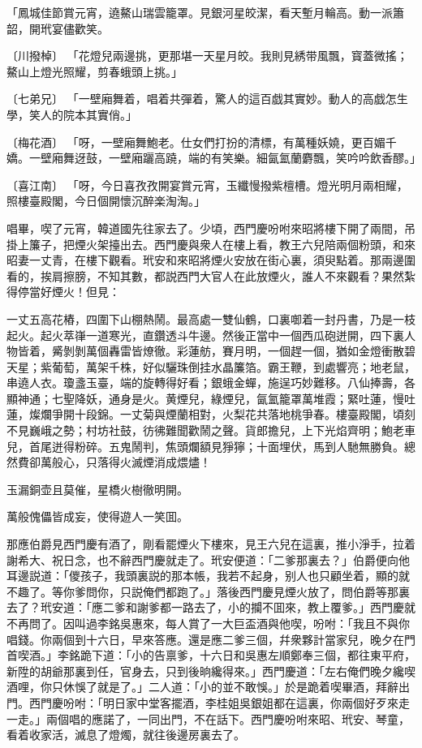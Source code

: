 \begin{myquote}
「鳳城佳節賞元宵，遶鰲山瑞雲籠罩。見銀河星皎潔，看天塹月輪高。動一派簫韶，開玳宴儘歡笑。

{\markfont〔川撥棹〕}
「花燈兒兩邊挑，更那堪一天星月皎。我則見綉带風飄，寳蓋微搖；鰲山上燈光照耀，剪春蛾頭上挑。」

{\markfont〔七弟兄〕}
「一壁廂舞着，唱着共彈着，驚人的這百戯其實妙。動人的高戯怎生學，笑人的院本其實俏。」

{\markfont〔梅花酒〕}
「呀，一壁廂舞鮑老。仕女們打扮的清標，有萬種妖嬈，更百媚千嬌。一壁廂舞迓鼓，一壁廂躧高蹺，端的有笑樂。細氤氳蘭麝飄，笑吟吟飲香醪。」

{\markfont〔喜江南〕}
「呀，今日喜孜孜開宴賞元宵，玉纖慢撥紫檀槽。燈光明月兩相耀，照樓臺殿閣，今日個開懷沉醉楽淘淘。」
\end{myquote}

唱畢，喫了元宵，韓道國先往家去了。少頃，西門慶吩咐來昭將樓下開了兩間，吊掛上簾子，把煙火架擡出去。西門慶與衆人在樓上看，教王六兒陪兩個粉頭，和來昭妻一丈青，在樓下觀看。玳安和來昭將煙火安放在街心裏，須臾點着。那兩邊圍看的，挨肩擦膀，不知其數，都説西門大官人在此放煙火，誰人不來觀看？果然紮得停當好煙火！但見：

\begin{myquote}
一丈五高花樁，四圍下山棚熱鬧。最高處一雙仙鶴，口裏啣着一封丹書，乃是一枝起火。起火萃嵂一道寒光，直鑽透斗牛邊。然後正當中一個西瓜砲迸開，四下裏人物皆着，觱剝剝萬個轟雷皆燎徹。彩蓮舫，賽月明，一個趕一個，猶如金燈衝散碧天星；紫葡萄，萬架千株，好似驪珠倒挂水晶簾箔。霸王鞭，到處響亮；地老鼠，串遶人衣。瓊盞玉臺，端的旋轉得好看；銀蛾金蟬，施逞巧妙難移。八仙捧壽，各顯神通；七聖降妖，通身是火。黄煙兒，綠煙兒，氤氳籠罩萬堆霞；緊吐蓮，慢吐蓮，燦爛爭開十段錦。一丈菊與煙蘭相對，火梨花共落地桃爭春。樓臺殿閣，頃刻不見巍峨之勢；村坊社鼓，彷彿難聞歡鬧之聲。貨郎擔兒，上下光焰齊明；鮑老車兒，首尾迸得粉碎。五鬼鬧判，焦頭爛額見猙獰；十面埋伏，馬到人馳無勝負。總然費卻萬般心，只落得火滅煙消成煨燼！

玉漏銅壶且莫催，星橋火樹徹明開。

萬般傀儡皆成妄，使得遊人一笑囬。
\end{myquote}

那應伯爵見西門慶有酒了，剛看罷煙火下樓來，見王六兒在這裏，推小淨手，拉着謝希大、祝日念，也不辭西門慶就走了。玳安便道：「二爹那裏去？」伯爵便向他耳邊説道：「儍孩子，我頭裏説的那本帳，我若不起身，别人也只顧坐着，顯的就不趣了。等你爹問你，只説俺們都跑了。」落後西門慶見煙火放了，問伯爵等那裏去了？玳安道：「應二爹和謝爹都一路去了，小的攔不囬來，教上覆爹。」西門慶就不再問了。因叫過李銘吳惠來，每人賞了一大巨盃酒與他喫，吩咐：「我且不與你唱錢。你兩個到十六日，早來答應。還是應二爹三個，幷衆夥計當家兒，晚夕在門首喫酒。」李銘跪下道：「小的告禀爹，十六日和吳惠左順鄭奉三個，都往東平府，新陞的胡爺那裏到任，官身去，只到後晌纔得來。」西門慶道：「左右俺們晚夕纔喫酒哩，你只休悞了就是了。」二人道：「小的並不敢悞。」於是跪着喫畢酒，拜辭出門。西門慶吩咐：「明日家中堂客擺酒，李桂姐吳銀姐都在這裏，你兩個好歹來走一走。」兩個唱的應諾了，一同出門，不在話下。西門慶吩咐來昭、玳安、琴童，看着收家活，滅息了燈燭，就往後邊房裏去了。

